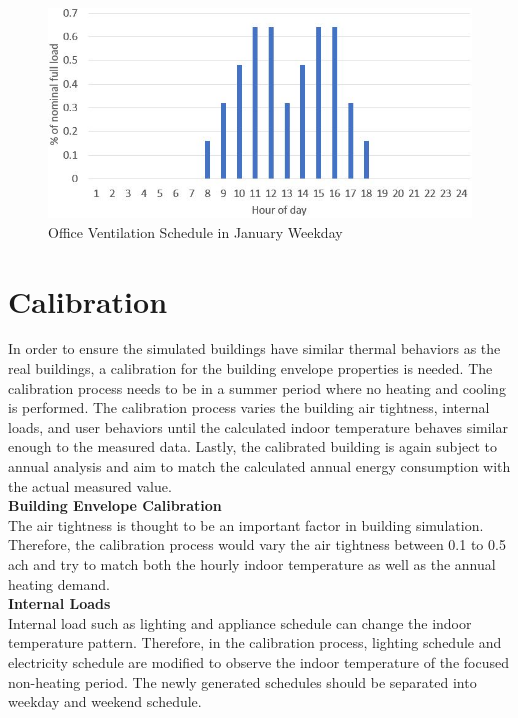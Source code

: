 \documentclass[a4paper, oneside]{discothesis}
\begin{document}
		\begin{figure}[h!]
		\centering
		\includegraphics[scale=0.8]{figures/JanOffice_Vent.jpg}
		\caption{Office Ventilation Schedule in January Weekday}
		\label{fig:JanOffice_Vent}
		\end{figure}
		
	\section{Calibration}
		In order to ensure the simulated buildings have similar thermal behaviors as the real buildings, a calibration for the building envelope properties is needed. The calibration process needs to be in a summer period where no heating and cooling is performed. The calibration process varies the building air tightness, internal loads, and user behaviors until the calculated indoor temperature behaves similar enough to the measured data. Lastly, the calibrated building is again subject to annual analysis and aim to match the calculated annual energy consumption with the actual measured value.\\
		
		

		\textbf{Building Envelope Calibration}\\
			The air tightness is thought to be an important factor in building simulation. Therefore, the calibration process would vary the air tightness between 0.1 to 0.5 ach and try to match both the hourly indoor temperature as well as the annual heating demand.\\


		\textbf{Internal Loads}\\
			Internal load such as lighting and appliance schedule can change the indoor temperature pattern. Therefore, in the calibration process, lighting schedule and electricity schedule are modified to observe the indoor temperature of the focused non-heating period. The newly generated schedules should be separated into weekday and weekend schedule.\\
\end{document}
